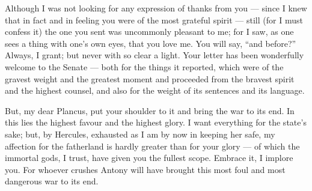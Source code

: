 

 Although I was not looking for any expression of thanks from you --- since I knew that in fact and in feeling you were of the most grateful spirit --- still (for I must confess it) the one you sent was uncommonly pleasant to me; for I saw, as one sees a thing with one's own eyes, that you love me. You will say, ``and before?'' Always, I grant; but never with so clear a light. Your letter has been wonderfully welcome to the Senate --- both for the things it reported, which were of the gravest weight and the greatest moment and proceeded from the bravest spirit and the highest counsel, and also for the weight of its sentences and its language.

 But, my dear Plancus, put your shoulder to it and bring the war to its end. In this lies the highest favour and the highest glory. I want everything for the state's sake; but, by Hercules, exhausted as I am by now in keeping her safe, my affection for the fatherland is hardly greater than for your glory --- of which the immortal gods, I trust, have given you the fullest scope. Embrace it, I implore you. For whoever crushes Antony will have brought this most foul and most dangerous war to its end.
